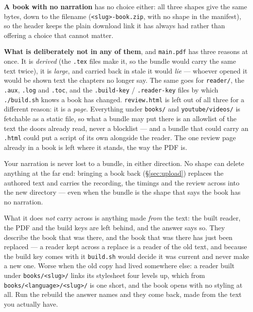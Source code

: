 \documentclass[11pt,oneside]{report}
\newcommand{\file}[1]{\texttt{#1}}
\newcommand{\menu}[1]{\textsf{#1}}
\begin{document}
\textbf{A book with no narration} has no choice either: all three shapes give
the same bytes, down to the filename (\file{<slug>-book.zip}, with no shape in the
manifest), so the header keeps the plain \menu{download} link it has always
had rather than offering a choice that cannot matter.

\textbf{What is deliberately not in any of them}, and \file{main.pdf} has
three reasons at once. It is \emph{derived} (the \file{.tex} files make it,
so the bundle would carry the same text twice), it is \emph{large}, and
carried back in stale it would \emph{lie} --- whoever opened it would be
shown text the chapters no longer say. The same goes for \file{reader/}, the
\file{.aux}, \file{.log} and \file{.toc}, and the \file{.build-key} /
\file{.reader-key} files by which \file{./build.sh} knows a book has changed.
\file{review.html} is left out of all three for a different reason: it is a
\emph{page}. Everything under \file{books/} and \file{youtube/videos/} is
fetchable as a static file, so what a bundle may put there is an allowlist of
the text the doors already read, never a blocklist --- and a bundle that
could carry an \file{.html} could put a script of its own alongside the
reader. The one review page already in a book is left where it stands, the
way the PDF is.

\begin{goodbox}
Your narration is never lost to a bundle, in either direction. No shape can
delete anything at the far end: bringing a book back
(\S\ref{sec:upload}) replaces the authored text and carries the recording,
the timings and the review across into the new directory --- even when the
bundle is the shape that says the book has no narration.

What it does \emph{not} carry across is anything made \emph{from} the text:
the built reader, the PDF and the build keys are left behind, and the answer
says so. They describe the book that was there, and the book that was there
has just been replaced --- a reader kept across a replace is a reader of the
old text, and because the build key comes with it \file{build.sh} would
decide it was current and never make a new one. Worse when the old copy had
lived somewhere else: a reader built under \file{books/<slug>/} links its
stylesheet four levels up, which from \file{books/<language>/<slug>/} is one
short, and the book opens with no styling at all. Run the rebuild the answer
names and they come back, made from the text you actually have.
\end{goodbox}
\end{document}
